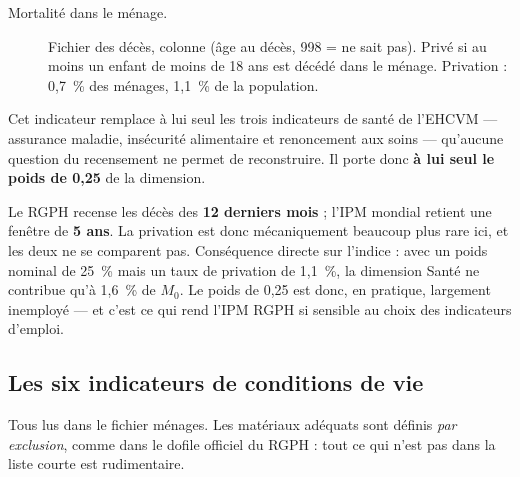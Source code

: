 \documentclass[11pt,a4paper]{article}
\begin{document}
\begin{description}
  \item[Mortalité dans le ménage.] Fichier des décès, colonne  (âge au décès,
  998 = ne sait pas). Privé si au moins un enfant de moins de 18 ans est décédé dans le ménage.
  Privation : 0,7~\% des ménages, 1,1~\% de la population.
\end{description}

Cet indicateur remplace à lui seul les trois indicateurs de santé de l'EHCVM --- assurance
maladie, insécurité alimentaire et renoncement aux soins --- qu'aucune question du recensement
ne permet de reconstruire. Il porte donc \textbf{à lui seul le poids de 0,25} de la dimension.

\begin{attention}
Le RGPH recense les décès des \textbf{12 derniers mois} ; l'IPM mondial retient une fenêtre de
\textbf{5 ans}. La privation est donc mécaniquement beaucoup plus rare ici, et les deux ne se
comparent pas. Conséquence directe sur l'indice : avec un poids nominal de 25~\% mais un taux
de privation de 1,1~\%, la dimension Santé ne contribue qu'à 1,6~\% de $M_0$. Le poids de 0,25
est donc, en pratique, largement inemployé --- et c'est ce qui rend l'IPM RGPH si sensible au
choix des indicateurs d'emploi.
\end{attention}

\subsection{Les six indicateurs de conditions de vie}

Tous lus dans le fichier ménages. Les matériaux adéquats sont définis \emph{par exclusion},
comme dans le dofile officiel du RGPH : tout ce qui n'est pas dans la liste courte est
rudimentaire.
\end{document}
